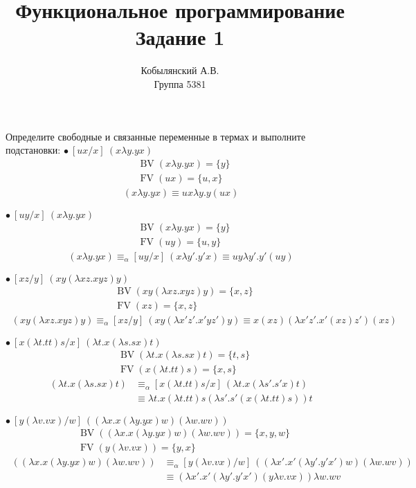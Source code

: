 \documentclass[a4paper,12pt]{article}
\title{Функциональное программирование \\ Задание 1}
\author{ Кобылянский А.В. \\ Группа 5381 }
\date {}
\newcounter{zcounter}
\newcommand{\z}{\par\addtocounter{zcounter}{1}%
\textsc{\fbox{\textbf{FP\arabic{zcounter}}}\quad} }
\DeclareMathOperator{\FV}{FV}
\DeclareMathOperator{\BV}{BV}
\begin{document}
\maketitle
\newpage
{}

\z Определите свободные и связанные переменные в термах и выполните подстановки:
\break
$\bullet \: [ux/x] \: (x\lambda y.yx)$
\begin{align*}
&\BV(x\lambda y.yx) = \{y\} \\
&\FV(ux) = \{u, x\}
\end{align*}
\begin{align*}
[ux/x] \: (x\lambda y.yx)  \equiv ux\lambda y.y(ux)
\end{align*}

$\bullet \: [uy/x] \: (x\lambda y.yx) $
\begin{align*}
&\BV(x\lambda y.yx) = \{y\} \\
&\FV(uy) = \{u, y\}
\end{align*}
\begin{align*}
[uy/x] \: (x\lambda y.yx)  \equiv_{\alpha} 
[uy/x] \: (x\lambda y'.y'x) \equiv
uy \lambda y'.y'(uy)
\end{align*}

$\bullet \: [xz/y] \: (xy(\lambda xz.xyz)y)$
\begin{align*}
&\BV(xy(\lambda xz.xyz)y) = \{x, z\} \\
&\FV(xz) = \{x, z\}
\end{align*}
\begin{align*}
[xz/y] \: (xy(\lambda xz.xyz)y) \equiv_\alpha
[xz/y] \: (xy(\lambda x'z'.x'yz')y) \equiv
x(xz)(\lambda x'z'.x'(xz)z')(xz)
\end{align*}

$\bullet \: [x(\lambda t. tt)s/x] \: (\lambda t. x (\lambda s.sx)t) $
\begin{align*}
&\BV(\lambda t. x (\lambda s.sx)t) = \{t, s\} \\
&\FV(x(\lambda t. tt)s) = \{x, s\}
\end{align*}
\begin{align*}
[x(\lambda t. tt)s/x] \: (\lambda t. x (\lambda s.sx)t) &\equiv_\alpha
[x(\lambda t. tt)s/x] \: (\lambda t. x (\lambda s'.s'x)t) \\
&\equiv \lambda t. x(\lambda t. tt)s (\lambda s'.s'(x(\lambda t. tt)s))t
\end{align*}

$\bullet \: [y(\lambda v. vx)/w]  \: ((\lambda x.x(\lambda y.yx)w)(\lambda w.wv)) $
\begin{align*}
&\BV((\lambda x.x(\lambda y.yx)w)(\lambda w.wv)) = \{x, y, w\} \\
&\FV(y(\lambda v. vx)) = \{y, x\}
\end{align*}
\begin{align*}
[y(\lambda v. vx)/w]  \: ((\lambda x.x(\lambda y.yx)w)(\lambda w.wv)) &\equiv_\alpha
[y(\lambda v. vx)/w]  \: ((\lambda x'.x'(\lambda y'.y'x')w)(\lambda w.wv)) \\
&\equiv (\lambda x'.x'(\lambda y'.y'x')(y\lambda v. vx)) \lambda w.wv
\end{align*}
\bigbreak
\end{document}
